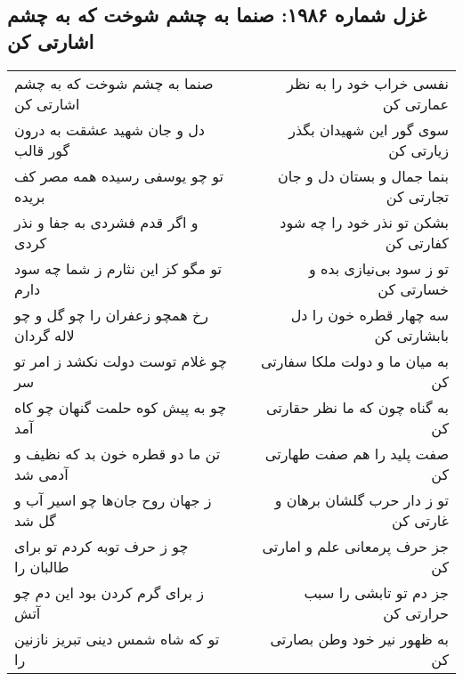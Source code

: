 \begin{center}
\section*{غزل شماره ۱۹۸۶: صنما به چشم شوخت که به چشم اشارتی کن}
\label{sec:1986}
\begin{longtable}{l p{0.5cm} r}
صنما به چشم شوخت که به چشم اشارتی کن
&&
نفسی خراب خود را به نظر عمارتی کن
\\
دل و جان شهید عشقت به درون گور قالب
&&
سوی گور این شهیدان بگذر زیارتی کن
\\
تو چو یوسفی رسیده همه مصر کف بریده
&&
بنما جمال و بستان دل و جان تجارتی کن
\\
و اگر قدم فشردی به جفا و نذر کردی
&&
بشکن تو نذر خود را چه شود کفارتی کن
\\
تو مگو کز این نثارم ز شما چه سود دارم
&&
تو ز سود بی‌نیازی بده و خسارتی کن
\\
رخ همچو زعفران را چو گل و چو لاله گردان
&&
سه چهار قطره خون را دل بابشارتی کن
\\
چو غلام توست دولت نکشد ز امر تو سر
&&
به میان ما و دولت ملکا سفارتی کن
\\
چو به پیش کوه حلمت گنهان چو کاه آمد
&&
به گناه چون که ما نظر حقارتی کن
\\
تن ما دو قطره خون بد که نظیف و آدمی شد
&&
صفت پلید را هم صفت طهارتی کن
\\
ز جهان روح جان‌ها چو اسیر آب و گل شد
&&
تو ز دار حرب گلشان برهان و غارتی کن
\\
چو ز حرف توبه کردم تو برای طالبان را
&&
جز حرف پرمعانی علم و امارتی کن
\\
ز برای گرم کردن بود این دم چو آتش
&&
جز دم تو تابشی را سبب حرارتی کن
\\
تو که شاه شمس دینی تبریز نازنین را
&&
به ظهور نیر خود وطن بصارتی کن
\\
\end{longtable}
\end{center}
